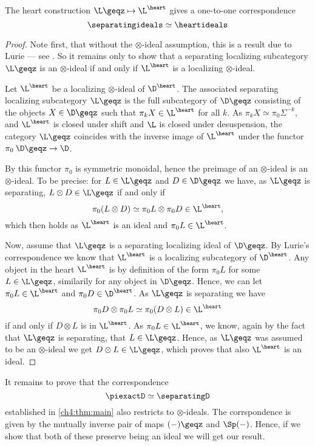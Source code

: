 \begin{lemma}
    \label{lm:monoidal-correspondence-prestable-abelian}
    The heart construction $\L\geqz \mapsto \L^\heart$ gives a one-to-one correspondence 
    \[\separatingideals \simeq \heartideals\]
\end{lemma}
\begin{proof}
    Note first, that without the $\otimes$-ideal assumption, this is a result due to Lurie --- see \cite[C.5.2.7]{lurie_SAG}. So it remains only to show that a separating localizing subcategory $\L\geqz$ is an $\otimes$-ideal if and only if $\L^\heart$ is a localizing $\otimes$-ideal. 

    Let $\L^\heart$ be a localizing $\otimes$-ideal of $\D^\heart$. The associated separating localizing subcategory $\L\geqz$ is the full subcategory of $\D\geqz$ consisting of the objects $X\in \D\geqz$ such that $\pi_k X\in \L^\heart$ for all $k$. As $\pi_k X \simeq \pi_0\Sigma^{-k}$, and $\L^\heart$ is closed under shift and $\L$ is closed under desuspension, the category $\L\geqz$ coincides with the inverse image of $\L^\heart$ under the functor $\pi_0 \: \D\geqz\to \D$. 
    
    By \cite[A.12]{antieau_nikolaus_2020} this functor $\pi_0$ is symmetric monoidal, hence the preimage of an $\otimes$-ideal is an $\otimes$-ideal. To be precise: for $L\in \L\geqz$ and $D\in \D\geqz$ we have, as $\L\geqz$ is separating, $L\otimes D \in \L\geqz$ if and only if 
    \[\pi_0(L\otimes D) \simeq \pi_0 L \otimes \pi_0 D \in \L^\heart,\]
    which then holds as $\L^\heart$ is an ideal and $\pi_0 L\in \L^\heart$. 

    Now, assume that $\L\geqz$ is a separating localizing ideal of $\D\geqz$. By Lurie's correspondence we know that $\L^\heart$ is a localizing subcategory of $\D^\heart$. Any object in the heart $\L^\heart$ is by definition of the form $\pi_0 L$ for some $L\in \L\geqz$, similarily for any object in $\D\geqz$. Hence, we can let $\pi_0 L \in \L^\heart$ and $\pi_0 D\in \D^\heart$. As $\L\geqz$ is separating we have 
    \[\pi_0 D \otimes \pi_0 L \simeq \pi_0(D \otimes L) \in \L^\heart\] 
    if and only if $D\otimes L$ is in $\L^\heart$. As $\pi_0 L \in \L^\heart$, we know, again by the fact that $\L\geqz$ is separating, that $L\in \L\geqz$. Hence, as $\L\geqz$ was assumed to be an $\otimes$-ideal we get $D\otimes L \in \L\geqz$, which proves that also $\L^\heart$ is an ideal. 
\end{proof}

It remains to prove that the correspondence 
\[\piexactD \simeq \separatingD\]
established in \cref{ch4:thm:main} also restricts to $\otimes$-ideals. The corrspondence is given by the mutually inverse pair of maps $(-)\geqz$ and $\Sp(-)$. Hence, if we show that both of these preserve being an ideal we will get our result. 

